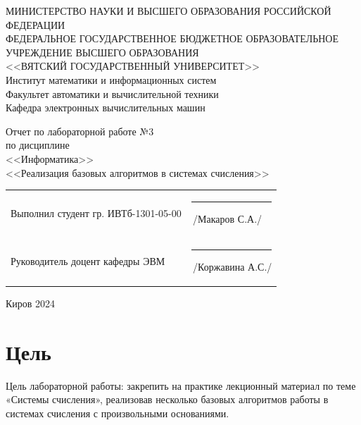 \documentclass[a4paper,14pt]{extarticle}
\begin{document}
	
	\newpage\thispagestyle{empty}
	\begin{center}
		\MakeUppercase{
			Министерство науки и высшего образования Российской Федерации\\
			Федеральное государственное бюджетное образовательное учреждение высшего образования\\
			<<Вятский Государственный Университет>>\\
		}
		Институт математики и информационных систем\\
		Факультет автоматики и вычислительной техники\\
		Кафедра электронных вычислительных машин
	\end{center}
	\vfill
	
	\begin{center}
		Отчет по лабораторной работе №3\\
		по дисциплине\\
		<<Информатика>>\\
		<<Реализация базовых алгоритмов в системах счисления>>
	\end{center}
	\vfill
	
	\noindent
	\begin{tabular}{ll}
		Выполнил студент гр. ИВТб-1301-05-00 \hspace{5mm} &
		\rule[-1mm]{25mm}{0.10mm}\,/Макаров С.А./\\
		
		Руководитель доцент кафедры ЭВМ & \rule[-1mm]{25mm}{0.10mm}\,/Коржавина А.С./\\
	\end{tabular}
	
	\vfill
	\begin{center}
		Киров 2024
	\end{center}
	
	\newpage
	\section*{Цель}
	Цель лабораторной работы: закрепить на практике лекционный материал по теме «Системы счисления», реализовав несколько базовых алгоритмов работы в системах счисления с произвольными основаниями.
	
\end{document}
